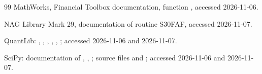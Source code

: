 \begin{thebibliography}{99}
MathWorks, Financial Toolbox documentation, function , accessed 2026-11-06.

NAG Library Mark 29, documentation of routine S30FAF, accessed 2026-11-07.

QuantLib: , ,
, , ,
; accessed 2026-11-06 and 2026-11-07.

SciPy: documentation of , , ; source files
 and ; accessed 2026-11-06 and 2026-11-07.

\end{thebibliography}
\endgroup
